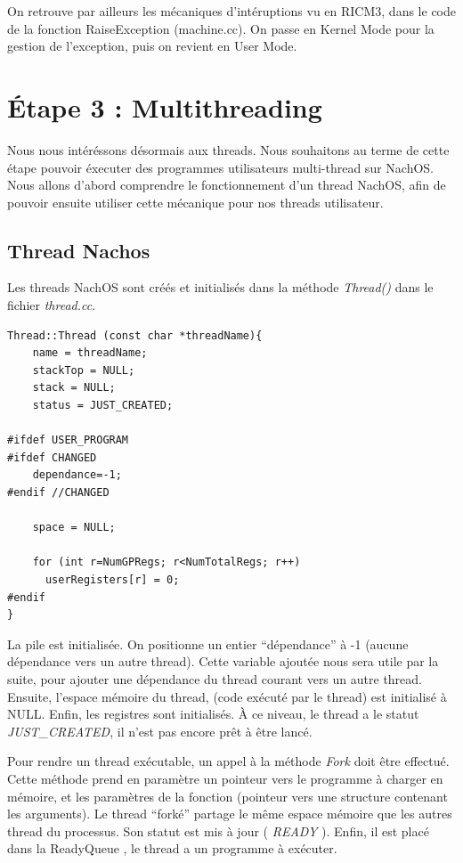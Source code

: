 \documentclass[a4paper,10pt]{article}
\begin{document}
On retrouve par ailleurs les mécaniques d'intéruptions vu en RICM3, dans le code de la fonction RaiseException (machine.cc).
On passe en Kernel Mode pour la gestion de l'exception, puis on revient en User Mode.
\newpage
\section{Étape 3 : Multithreading}
Nous nous intéréssons désormais aux threads. Nous souhaitons au terme de cette étape pouvoir éxecuter des programmes utilisateurs multi-thread
sur NachOS. Nous allons d'abord comprendre le fonctionnement d'un thread NachOS, afin de pouvoir ensuite utiliser cette mécanique pour nos threads utilisateur.

\subsection{Thread Nachos}
Les threads NachOS sont créés et initialisés dans la méthode \textit{Thread()} dans le fichier \textit{thread.cc}.
\begin{lstlisting}[frame=single]
 Thread::Thread (const char *threadName){
    name = threadName;
    stackTop = NULL;
    stack = NULL;
    status = JUST_CREATED;

#ifdef USER_PROGRAM
#ifdef CHANGED
    dependance=-1;
#endif //CHANGED

    space = NULL;

    for (int r=NumGPRegs; r<NumTotalRegs; r++)
      userRegisters[r] = 0;
#endif
}
\end{lstlisting}
La pile est initialisée. On positionne un entier ``dépendance'' à -1 (aucune dépendance vers un autre thread). Cette variable ajoutée nous sera utile par la suite,
pour ajouter une dépendance du thread courant vers un autre thread. Ensuite, l'espace mémoire du thread, (code exécuté par le thread) est initialisé à NULL. Enfin,
les registres sont initialisés. À ce niveau, le thread a le statut \textit{JUST\_CREATED}, il n'est pas encore prêt à être lancé.

\vspace{0.5cm}

Pour rendre un thread exécutable, un appel à la méthode \textit{Fork} doit être effectué. Cette méthode prend en paramètre un pointeur vers le programme à charger en mémoire, et
les paramètres de la fonction (pointeur vers une structure contenant les arguments). Le thread ``forké'' partage le même espace mémoire que les autres thread du processus.
Son statut est mis à jour ( \textit{READY} ). Enfin, il est placé dans la ReadyQueue , le thread a un programme à exécuter.
\end{document}
